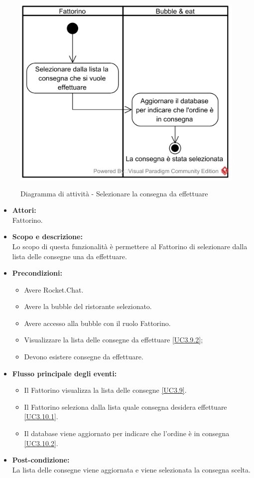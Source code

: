 \begin{figure}[H]
	\centering
	\includegraphics[height=10cm]{../../documenti/AnalisiDeiRequisiti/Diagrammi_img/attivita/uc_bubble_selezionare_consegna.png}
	\caption{Diagramma di attività - Selezionare la consegna da effettuare}
\end{figure}

\begin{itemize}
	\item \textbf{Attori:}
	\\Fattorino.
	\item \textbf{Scopo e descrizione:} 
	\\Lo scopo di questa funzionalità è permettere al Fattorino di selezionare dalla lista delle consegne una da effettuare.
	\item \textbf{Precondizioni:}
	\begin{itemize}
		\item Avere Rocket.Chat.
		\item Avere la bubble del ristorante selezionato.
		\item Avere accesso alla bubble con il ruolo Fattorino.
		\item Visualizzare la lista delle consegne da effettuare \ref{UC3.9.2};
		\item Devono esistere consegne da effettuare.
	\end{itemize}
	\item \textbf{Flusso principale degli eventi:}
	\begin{itemize}
		\item Il Fattorino visualizza la lista delle consegne \ref{UC3.9}.
		\item Il Fattorino seleziona dalla lista quale consegna desidera effettuare \ref{UC3.10.1}.
		\item Il database viene aggiornato per indicare che l'ordine è in consegna \ref{UC3.10.2}.
	\end{itemize}
	\item \textbf{Post-condizione:}
	\\La lista delle consegne viene aggiornata e viene selezionata la consegna scelta.
\end{itemize}

